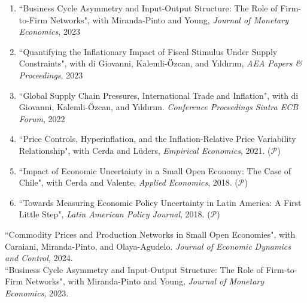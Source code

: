 \documentclass[10pt]{article}
\begin{document}
\begin{enumerate}[wide, labelwidth=!, labelindent=0pt]
 \item ``Business Cycle Asymmetry and Input-Output Structure: The Role of Firm-to-Firm Networks", with Miranda-Pinto and Young, \emph{Journal of Monetary Economics,} 2023\\[-0.125in]

\item \noindent ``Quantifying the Inflationary Impact of Fiscal Stimulus Under Supply Constraints", with di Giovanni, Kalemli-\"{O}zcan, and Y{\i}ld{\i}r{\i}m, \emph{AEA Papers \& Proceedings}, 2023\\[-0.125in]

\item \noindent ``Global Supply Chain Pressures, International Trade and Inflation", with di Giovanni, Kalemli-\"{O}zcan, and Y{\i}ld{\i}r{\i}m. {\emph{Conference Proceedings Sintra ECB Forum}, 2022}\\[-0.125in]

\item \noindent ``Price Controls, Hyperinflation, and the Inflation-Relative Price Variability Relationship", with Cerda and L\"{u}ders, \emph{Empirical Economics}, 2021. ($\mathcal{P}$)\\[-0.125in]

\item \noindent ``Impact of Economic Uncertainty in a Small Open Economy: The Case of Chile", with Cerda and Valente, \emph{Applied Economics}, 2018. ($\mathcal{P}$)\\[-0.125in]

\item \noindent ``Towards Measuring Economic Policy Uncertainty in Latin America: A First Little Step", \emph{Latin American Policy Journal}, 2018. ($\mathcal{P}$)\\[-0.125in]
\end{enumerate}
\fi

\noindent ``Commodity Prices and Production Networks in Small Open Economies", with Caraiani, Miranda-Pinto, and Olaya-Agudelo. \textit{Journal of Economic Dynamics and Control,} 2024.\\[-0.125in]


\noindent ``Business Cycle Asymmetry and Input-Output Structure: The Role of Firm-to-Firm Networks", with Miranda-Pinto and Young, \textit{Journal of Monetary Economics,} 2023.\\[-0.125in]
\end{document}
